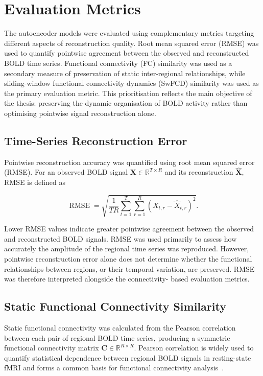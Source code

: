 \section{Evaluation Metrics}

The autoencoder models were evaluated using complementary metrics targeting
different aspects of reconstruction quality. Root mean squared error (RMSE)
was used to quantify pointwise agreement between the observed and
reconstructed BOLD time series. Functional connectivity (FC) similarity was
used as a secondary measure of preservation of static inter-regional
relationships, while sliding-window functional connectivity dynamics
(SwFCD) similarity was used as the primary evaluation metric. This
prioritisation reflects the main objective of the thesis: preserving the
dynamic organisation of BOLD activity rather than optimising pointwise
signal reconstruction alone.

\subsection{Time-Series Reconstruction Error}

Pointwise reconstruction accuracy was quantified using root mean squared
error (RMSE). For an observed BOLD signal
$\mathbf{X}\in\mathbb{R}^{T\times R}$ and its reconstruction
$\hat{\mathbf{X}}$, RMSE is defined as

\begin{equation}
    \operatorname{RMSE}
    =
    \sqrt{
        \frac{1}{TR}
        \sum_{t=1}^{T}
        \sum_{r=1}^{R}
        \left(
            X_{t,r}-\hat{X}_{t,r}
        \right)^2
    }.
\end{equation}

Lower RMSE values indicate greater pointwise agreement between the observed
and reconstructed BOLD signals. RMSE was used primarily to assess how
accurately the amplitude of the regional time series was reproduced.
However, pointwise reconstruction error alone does not determine whether
the functional relationships between regions, or their temporal variation,
are preserved. RMSE was therefore interpreted alongside the connectivity-
based evaluation metrics.

\subsection{Static Functional Connectivity Similarity}

Static functional connectivity was calculated from the Pearson correlation
between each pair of regional BOLD time series, producing a symmetric
functional connectivity matrix
$\mathbf{C}\in\mathbb{R}^{R\times R}$. Pearson correlation is widely used
to quantify statistical dependence between regional BOLD signals in
resting-state fMRI and forms a common basis for functional connectivity
analysis~\cite{Hutchison2013}.

